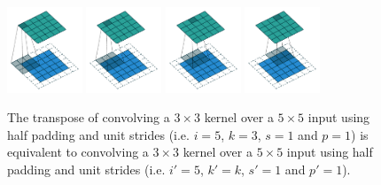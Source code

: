 \documentclass{article}
\begin{document}
\begin{figure}[t]
    \centering
    \includegraphics[width=0.2\textwidth]
        {pdf/same_padding_no_strides_transposed_00.pdf}
    \includegraphics[width=0.2\textwidth]
        {pdf/same_padding_no_strides_transposed_01.pdf}
    \includegraphics[width=0.2\textwidth]
        {pdf/same_padding_no_strides_transposed_02.pdf}
    \includegraphics[width=0.2\textwidth]
        {pdf/same_padding_no_strides_transposed_03.pdf}
    \caption{\label{fig:same_padding_no_strides_transposed} The transpose
        of convolving a $3 \times 3$ kernel over a $5 \times 5$ input using half
        padding and unit strides (i.e. $i = 5$, $k = 3$, $s = 1$ and $p = 1$) is
        equivalent to convolving a $3 \times 3$ kernel over a $5 \times 5$ input
        using half padding and unit strides (i.e. $i' = 5$, $k' = k$, $s' = 1$
        and $p' = 1$).}
\end{figure}
\end{document}
